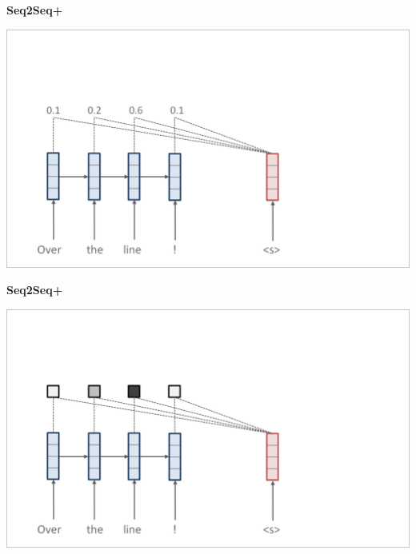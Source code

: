 \documentclass[aspectratio=169]{beamer}
\newcommand{\air}{\vspace{0.25cm}}
\begin{document}
\begin{frame}
  \begin{center}
    \textbf{Seq2Seq+} \air

  \end{center}
\center
\vspace{-5mm}
 \air
\includegraphics[scale=0.37]{nmt-attn2}
\end{frame}
\begin{frame}
  \begin{center}
    \textbf{Seq2Seq+} \air

  \end{center}
\center
\vspace{-5mm}
 \air
\includegraphics[scale=0.37]{nmt-attn3}
\end{frame}
\end{document}
